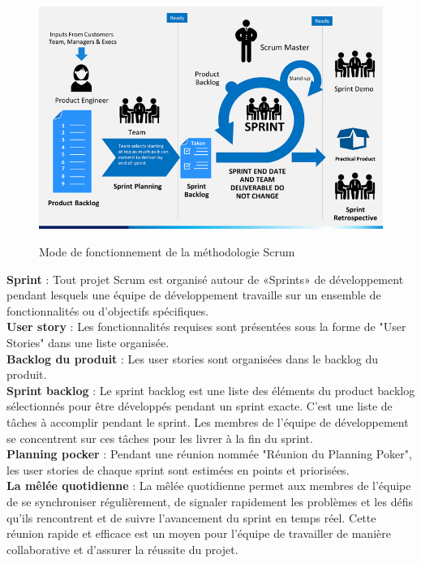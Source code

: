     \begin{figure}[htbp]
      \centering
      \includegraphics[width=1\textwidth]{chap1.images/scrum-process-slide2_2.png}
      \caption{Mode de fonctionnement de la méthodologie Scrum}\cite{ref1}
    \end{figure}
    
    \noindent\textbf{Sprint} : Tout projet Scrum est organisé autour de «Sprints» de développement pendant lesquels une équipe de développement travaille sur un ensemble de fonctionnalités ou d'objectifs spécifiques.\\
    
    \noindent\textbf{User story} : Les fonctionnalités requises sont présentées sous la forme de "User Stories" dans une liste organisée.\\
    
    \noindent\textbf{Backlog du produit} : Les user stories sont organisées dans le backlog du produit.\\
    
    \noindent\textbf{Sprint backlog} : Le sprint backlog est une liste des éléments du product backlog sélectionnés pour être développés pendant un sprint exacte. C'est une liste de tâches à accomplir pendant le sprint. Les membres de l'équipe de développement se concentrent sur ces tâches pour les livrer à la fin du sprint.\\
    
    \noindent\textbf{Planning pocker} : Pendant une réunion nommée "Réunion du Planning Poker", les user stories de chaque sprint sont estimées en points et priorisées.\\
    
    \noindent\textbf{La mêlée quotidienne} : La mêlée quotidienne permet aux membres de l'équipe de se synchroniser régulièrement, de signaler rapidement les problèmes et les défis qu'ils rencontrent et de suivre l'avancement du sprint en temps réel. Cette réunion rapide et efficace est un moyen pour l'équipe de travailler de manière collaborative et d'assurer la réussite du projet.\\
       
